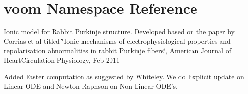 \hypertarget{namespacevoom}{
\section{voom Namespace Reference}
\label{namespacevoom}
}


Ionic model for Rabbit \hyperlink{classvoom_1_1_purkinje}{Purkinje} structure. Developed based on the paper by Corrias et al titled \char`\"{}Ionic mechanisms of electrophysiological properties 
  and repolarization abnormalities in rabbit Purkinje fibers\char`\"{}, American Journal of HeartCirculation Physiology, Feb 2011
\begin{DoxyItemize}
\item Added Faster computation as suggested by Whiteley. We do Explicit update on Linear ODE and Newton-\/Raphson on Non-\/Linear ODE's. 
\end{DoxyItemize} 

